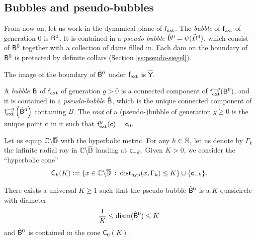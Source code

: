 \documentclass{amsart}
\begin{document}
\subsection{Bubbles and pseudo-bubbles}
\label{ss:bubbles-and-pseudo-bubbles}

From now on, let us work in the dynamical plane of $\mathsf{f}_{\textnormal{ext}}$. 
The \emph{bubble} of $\mathsf{f}_{\textnormal{ext}}$ of generation $0$ is $\mathsf{B}^0$. 
It is contained in a \emph{pseudo-bubble} $\hat{\mathsf{B}}^0 = \psi(\hat{B}^0)$, which consist of $\mathsf{B}^0$ together with a collection of dams filled in. 
Each dam on the boundary of $\mathsf{B}^0$ is protected by definite collars (Section  \ref{ss:pseudo-siegel}).
 
The image of the boundary of $\hat{\mathsf{B}}^0$ under $\mathsf{f}_{\textnormal{ext}}$ is $\hat{\mathsf{Y}}$.

A \emph{bubble} $\mathsf{B}$ of $\mathsf{f}_{\textnormal{ext}}$ of generation $g>0$ is a connected component of $\mathsf{f}_{\textnormal{ext}}^{-g}(\mathsf{B}^0)$, and it is contained in a \emph{pseudo-bubble} $\hat{\mathsf{B}}$, which is the unique connected component of $\mathsf{f}_{\textnormal{ext}}^{-g}\left(\hat{\mathsf{B}}^0\right)$ containing $B$. 
The \emph{root} of a (pseudo-)bubble of generation $g\geq 0$ is the unique point $\mathsf{c}$ in it such that $\mathsf{f}_{\textnormal{ext}}^{g}(\mathsf{c})=\mathsf{c}_0$. 

Let us equip $\mathbb{C} \backslash \overline{\mathbb{D}}$ with the hyperbolic metric. 
For any $k \in \mathbb{N}$, let us denote by $\Gamma_k$ the infinite radial ray in $\mathbb{C} \backslash \overline{\mathbb{D}}$ landing at $\mathsf{c}_{-k}$. 
Given $K>0$, we consider the ``hyperbolic cone''
\[
    \mathsf{C}_k(K) := \{ x \in \mathbb{C} \backslash \overline{\mathbb{D}} \: : \: \textnormal{dist}_{\text{hyp}}(x, \Gamma_k) \leq K\} \cup \{\mathsf{c}_{-k}\}.
\]

\begin{lemma}
\label{lem:main-bubble}
    There exists a universal $K\geq 1$ such that the pseudo-bubble $\hat{\mathsf{B}}^0$ is a $K$-quasicircle with diameter
    \[
        \frac{1}{K} \leq \textnormal{diam}(\hat{\mathsf{B}}^0) \leq K
    \]
    and $\hat{\mathsf{B}}^0$ is contained in the cone $\mathsf{C}_0(K)$.
\end{lemma}
\end{document}
